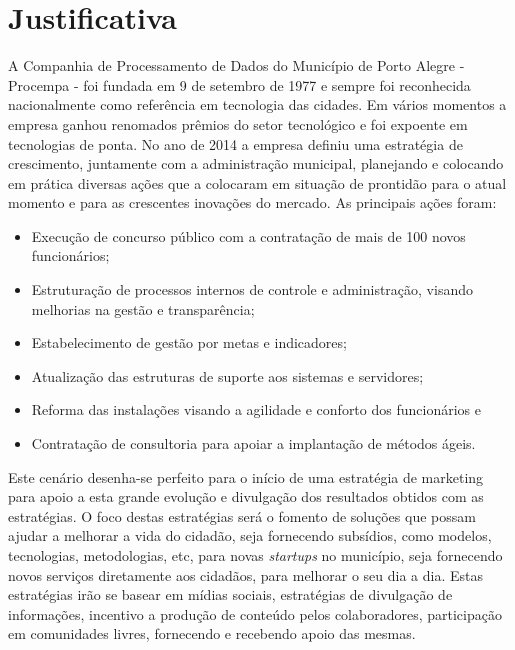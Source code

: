 \chapter{Justificativa}

A Companhia de Processamento de Dados do Município de Porto Alegre  - Procempa - foi fundada em 9 de setembro de 1977 e sempre foi reconhecida nacionalmente como referência em tecnologia das cidades. Em vários momentos a empresa ganhou renomados prêmios do setor tecnológico e foi expoente em tecnologias de ponta.
No ano de 2014 a empresa definiu uma estratégia de crescimento, juntamente com a administração municipal, planejando e colocando em prática diversas ações que a colocaram em situação de prontidão para o atual momento e para as crescentes inovações do mercado. As principais ações foram:

\begin{itemize}
\item Execução de concurso público com a contratação de mais de 100 novos funcionários;
\item Estruturação de processos internos de controle e administração, visando melhorias na gestão e transparência;
\item Estabelecimento de gestão por metas e indicadores;
\item Atualização das estruturas de suporte aos sistemas e servidores;
\item Reforma das instalações visando a agilidade e conforto dos funcionários e
\item Contratação de consultoria para apoiar a implantação de métodos ágeis.
\end{itemize}
Este cenário desenha-se perfeito para o início de uma estratégia de marketing para apoio a esta grande evolução e divulgação dos resultados obtidos com as estratégias. O foco destas estratégias será o fomento de soluções que possam ajudar a melhorar a vida do cidadão, seja fornecendo subsídios, como modelos, tecnologias, metodologias, etc, para novas \textit{startups} no município, seja fornecendo novos serviços diretamente aos cidadãos, para melhorar o seu dia a dia.
Estas estratégias irão se basear em mídias sociais, estratégias de divulgação de informações, incentivo a produção de conteúdo pelos colaboradores, participação em comunidades livres, fornecendo e recebendo apoio das mesmas.
